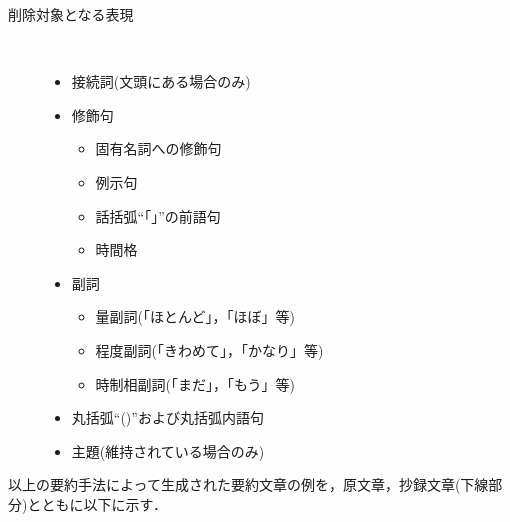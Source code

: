 \begin{description}
 \item[削除対象となる表現] \
	    \begin{itemize}
	     \item 接続詞(文頭にある場合のみ)
	     \item 修飾句
 			     \begin{itemize}
 			      \item 固有名詞への修飾句
 			      \item 例示句
 			      \item 話括弧``「」''の前語句
			      \item 時間格
 			     \end{itemize}
	     \item 副詞
 			     \begin{itemize}
 			      \item 量副詞(「ほとんど」，「ほぼ」等)
 			      \item 程度副詞(「きわめて」，「かなり」等)
 			      \item 時制相副詞(「まだ」，「もう」等)
 			     \end{itemize}
	     \item 丸括弧``()''および丸括弧内語句
	     \item 主題(維持されている場合のみ)
	    \end{itemize}
\end{description}

以上の要約手法によって生成された要約文章の例を，原文章，抄録文章(下線部
分)とともに以下に示す．

\vspace{5mm}

